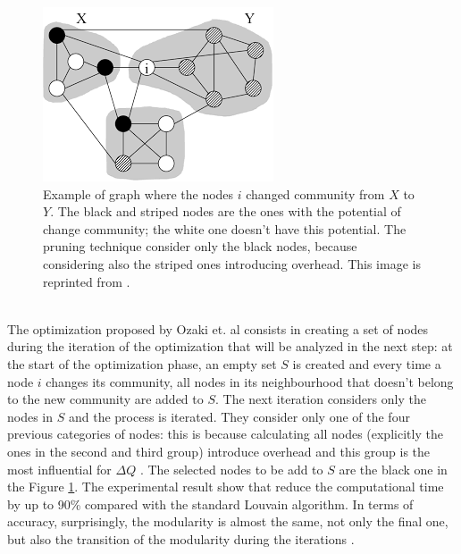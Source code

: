 \begin{figure}
	\centering
	\includegraphics[width=0.7\linewidth]{0-resources/pruning}
	\caption{Example of graph where the nodes $i$ changed community from $X$ to $Y$. The black and striped nodes are the ones with the potential of change community; the white one doesn't have this potential. The pruning technique consider only the black nodes, because considering also the striped ones introducing overhead. This image is reprinted from \cite{pruning}.}
	\label{fig:pruning}
\end{figure}\\
The optimization proposed by Ozaki et. al consists in creating a set of nodes during the iteration of the optimization that will be analyzed in the next step: at the start of the optimization phase, an empty set $S$ is created and every time a node $i$ changes its community, all nodes in its neighbourhood that doesn't belong to the new community are added to $S$. The next iteration considers only the nodes in $S$ and the process is iterated. They consider only one of the four previous categories of nodes: this is because calculating all nodes (explicitly the ones in the second and third group) introduce overhead and this group is the most influential for $\Delta Q$ \cite{pruning}. The selected nodes to be add to $S$ are the black one in the Figure \ref{fig:pruning}. 
The experimental result show that reduce the computational time by up to 90\% compared with the standard Louvain algorithm. In terms of accuracy, surprisingly, the modularity is almost the same,  not only the final one, but also the transition of the modularity during the iterations \cite{pruning}. 
